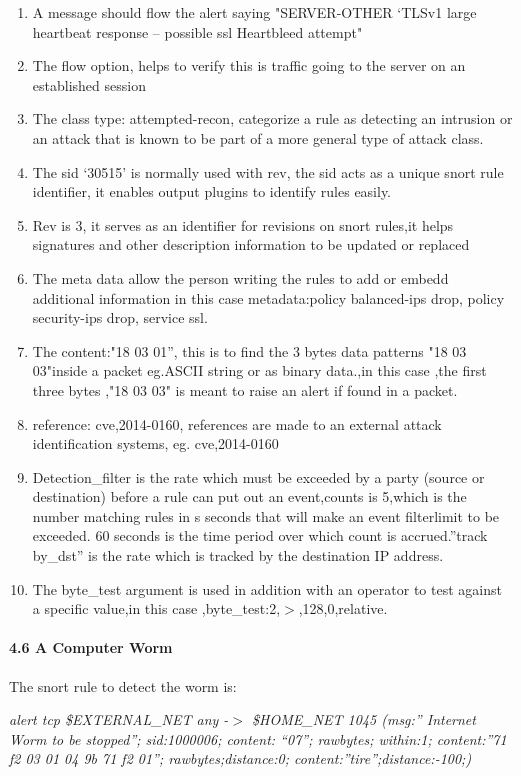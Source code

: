 \documentclass{article} %
\begin{document}
\begin{enumerate}
\item  A message should flow the alert saying "SERVER-OTHER `TLSv1 large heartbeat response -- possible ssl Heartbleed attempt"

\item  The flow option, helps to verify this is traffic going to the server on an established session

\item  The class type: attempted-recon, categorize a rule as detecting an intrusion or an attack that is known to be part of a more general type of attack class.

\item  The sid `30515' is normally used with rev, the sid acts as a unique snort rule identifier, it enables output plugins to identify rules easily.

\item  Rev is 3, it serves as an identifier for revisions on snort rules,it helps signatures and other description information to be updated or replaced 

\item  The meta data allow the person writing the rules to add or embedd additional information in this case metadata:policy balanced-ips drop, policy security-ips drop, service ssl.

\item  The content:"{\textbar}18 03 01{\textbar}'', this is to find the 3 bytes data patterns "{\textbar}18 03 03{\textbar}"inside a packet eg.ASCII string or as binary data.,in this case ,the first three bytes ,"{\textbar}18 03 03{\textbar}" is meant to raise an alert if found in a packet.

\item  reference: cve,2014-0160, references are made to an external attack identification systems, eg. cve,2014-0160

\item  Detection\_filter is the rate which must be exceeded by a party (source or destination) before a rule can put out an event,counts is 5,which is the number matching rules in s seconds that will make an event filterlimit to be exceeded. 60 seconds is the time period over which count is accrued.''track by\_dst'' is the rate which is tracked by the  destination IP address.

\item  The byte\_test argument is used in addition with an operator to test against a specific value,in this case ,byte\_test:2,$>$,128,0,relative.
\end{enumerate}

\noindent 
\paragraph{4.6 A Computer Worm}

\noindent The snort rule to detect the worm is:

\noindent \textit{alert tcp \$EXTERNAL\_NET any -$>$ \$HOME\_NET 1045 (msg:'' Internet Worm to be stopped''; sid:1000006; content: ``07''; rawbytes; within:1; content:''71 f2 03 01 04 9b 71 f2 01''; rawbytes;distance:0; content:''tire'';distance:-100;)}
\end{document}

